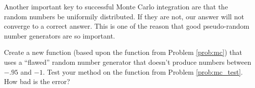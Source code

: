 Another important key to successful Monte Carlo integration are that the random numbers be uniformily distributed. If they are not, our answer will not converge to a correct answer. This is one of the reason that good pseudo-random number generators are so important.

\begin{problem}
\label{prob:mc_flawed}
Create a new function (based upon the function from Problem \ref{prob:mc}) that uses a ``flawed'' random number generator that doesn't produce numbers between $-.95$ and $-1$. Test your method on the function from Problem \ref{prob:mc_test}. How bad is the error? 
\end{problem}




%
%
%
%
%
%
%
%
